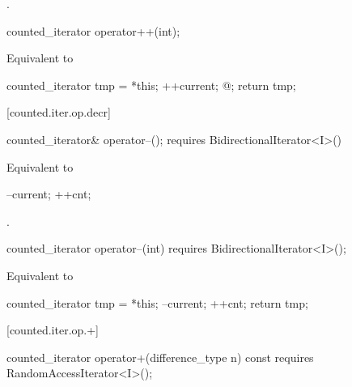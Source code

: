 \begin{addedblock}
\begin{itemdescr}
\pnum
\returns {}.
\end{itemdescr}

%
%
\begin{itemdecl}
counted_iterator operator++(int);
\end{itemdecl}

\begin{itemdescr}
\pnum
\requires {}

\pnum
\effects Equivalent to
\begin{codeblock}
counted_iterator tmp = *this;
++current;
@\dcr@cnt;
return tmp;
\end{codeblock}
\end{itemdescr}

[counted.iter.op.decr]{}

%
%
\begin{itemdecl}
  counted_iterator& operator--();
    requires BidirectionalIterator<I>()
\end{itemdecl}

\begin{itemdescr}
\pnum
\effects Equivalent to
\begin{codeblock}
--current;
++cnt;
\end{codeblock}

\pnum
\returns {}.
\end{itemdescr}

%
%
\begin{itemdecl}
  counted_iterator operator--(int)
    requires BidirectionalIterator<I>();
\end{itemdecl}

\begin{itemdescr}
\pnum
\effects Equivalent to
\begin{codeblock}
counted_iterator tmp = *this;
--current;
++cnt;
return tmp;
\end{codeblock}
\end{itemdescr}

[counted.iter.op.+]{}

%
%
\begin{itemdecl}
  counted_iterator operator+(difference_type n) const
    requires RandomAccessIterator<I>();
\end{itemdecl}


\end{addedblock}

